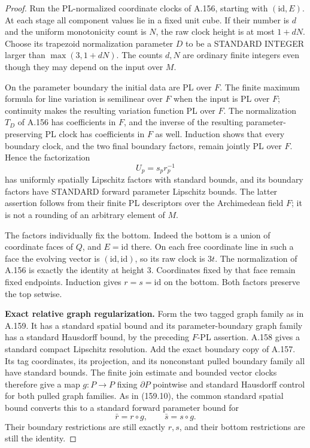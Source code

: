 \begin{proof}
Run the PL-normalized coordinate clocks of A.156, starting
with $(\mathrm{id},E)$. At each stage all component values
lie in a fixed unit cube. If their number is $d$ and the
uniform monotonicity count is $N$, the raw clock height is
at most $1+dN$. Choose its trapezoid normalization parameter
$D$ to be a STANDARD INTEGER larger than $\max(3,1+dN)$.
The counts $d,N$ are ordinary finite integers even though
they may depend on the input over $M$.

On the parameter boundary the initial data are PL over $F$.
The finite maximum formula for line variation is semilinear
over $F$ when the input is PL over $F$; continuity makes
the resulting variation function PL over $F$. The
normalization $T_D$ of A.156 has coefficients in $F$,
and the inverse of the resulting parameter-preserving PL
clock has coefficients in $F$ as well. Induction shows
that every boundary clock, and the two final boundary
factors, remain jointly PL over $F$.
Hence the factorization
\[
 U_p=s_pr_p^{-1}
 \tag{160.2}
\]
has uniformly spatially Lipschitz factors with standard
bounds, and its boundary factors have STANDARD forward
parameter Lipschitz bounds. The latter assertion follows
from their finite PL descriptors over the Archimedean field
$F$; it is not a rounding of an arbitrary element of $M$.

The factors individually fix the bottom. Indeed the bottom
is a union of coordinate faces of $Q$, and $E=\mathrm{id}$
there. On each free coordinate line in such a face the
evolving vector is $(\mathrm{id},\mathrm{id})$, so its raw
clock is $3t$. The normalization of A.156 is exactly the
identity at height $3$. Coordinates fixed by that face
remain fixed endpoints. Induction gives $r=s=\mathrm{id}$
on the bottom. Both factors preserve the top setwise.

\textbf{Exact relative graph regularization.}\quad
Form the two tagged graph family as in A.159. It has a
standard spatial bound and its parameter-boundary graph
family has a standard Hausdorff bound, by the preceding
$F$-PL assertion. A.158 gives a standard compact Lipschitz
resolution. Add the exact boundary copy of A.157.
Its tag coordinates, its projection, and its nonconstant
pulled boundary family all have standard bounds.
The finite join estimate and bounded vector clocks
therefore give a map $g:P\to P$ fixing $\partial P$
pointwise and standard Hausdorff control for both pulled
graph families. As in (159.10), the common standard
spatial bound converts this to a standard forward
parameter bound for
\[
 \bar r=r\circ g,\qquad \bar s=s\circ g.
\]
Their boundary restrictions are still exactly $r,s$,
and their bottom restrictions are still the identity.


\end{proof}
